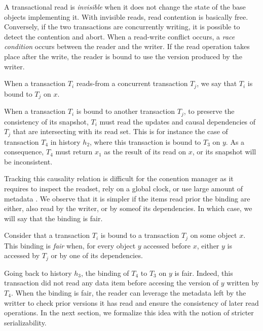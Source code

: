 A transactional read is \emph{invisible} when it does not change the state of the base objects implementing it.
With invisible reads, read contention is basically free.
Conversely, if the two transactions are concurrently writing, it is possible to detect the contention and abort. %
When a read-write conflict occurs, a \emph{race condition} occurs between the reader and the writer.
If the read operation takes place after the write, the reader is bound to use the version produced by the writer.

\begin{definition}[Binding]
  When a transaction $T_i$ reads-from a concurrent transaction $T_j$, we say that $T_i$ is bound to $T_j$ on $x$.
\end{definition}

When a transaction $T_i$ is bound to another transaction $T_j$, to preserve the consistency of its snapshot, $T_i$ must read the updates and causal dependencies of $T_j$ that are intersecting with its read set.
This is for instance the case of transaction $T_4$ in history $h_2$, where this transaction is bound to $T_3$ on $y$.
As a consequence, $T_4$ must return $x_1$ as the result of its read on $x$, or its snapshot will be inconsistent.

Tracking this causality relation is difficult for the conention manager as it requires to inspect the readset, rely on a global clock, or use large amount of metadata \cite{}.
We observe that it is simpler if the items read prior the binding are either, also read by the writer, or by someof its dependencies.
In which case, we will say that the binding is fair.

\begin{definition}
  Consider that a transaction $T_i$ is bound to a transaction $T_j$ on some object $x$.
  This binding is \emph{fair} when, for every object $y$ accessed before $x$, either $y$ is accessed by $T_j$ or by one of its dependencies.
\end{definition}

Going back to history $h_3$, the binding of $T_4$ to $T_3$ on $y$ is fair.
Indeed, this transaction did not read any data item before accesing the version of $y$ written by $T_4$.
When the binding is fair, the reader can leverage the metadata left by the writter to check prior versions it has read and ensure the consistency of later read operations.
In the next section, we formalize this idea with the notion of stricter serializability.

